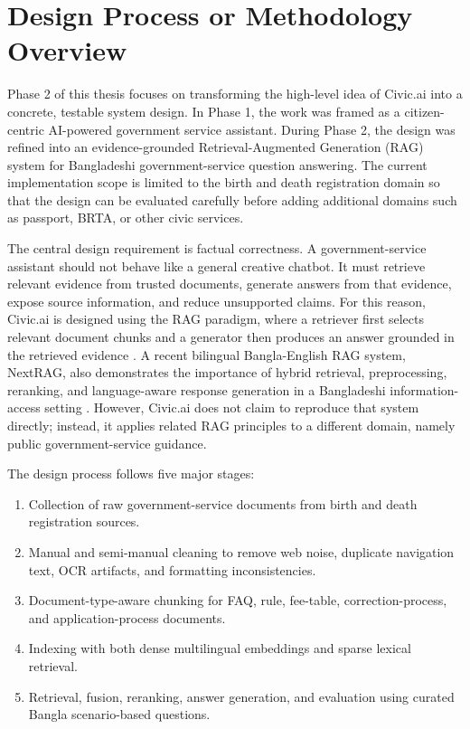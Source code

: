 \section{Design Process or Methodology Overview}

Phase 2 of this thesis focuses on transforming the high-level idea of Civic.ai into a concrete, testable system design. In Phase 1, the work was framed as a citizen-centric AI-powered government service assistant. During Phase 2, the design was refined into an evidence-grounded Retrieval-Augmented Generation (RAG) system for Bangladeshi government-service question answering. The current implementation scope is limited to the birth and death registration domain so that the design can be evaluated carefully before adding additional domains such as passport, BRTA, or other civic services.

The central design requirement is factual correctness. A government-service assistant should not behave like a general creative chatbot. It must retrieve relevant evidence from trusted documents, generate answers from that evidence, expose source information, and reduce unsupported claims. For this reason, Civic.ai is designed using the RAG paradigm, where a retriever first selects relevant document chunks and a generator then produces an answer grounded in the retrieved evidence \cite{lewis2020rag}. A recent bilingual Bangla-English RAG system, NextRAG, also demonstrates the importance of hybrid retrieval, preprocessing, reranking, and language-aware response generation in a Bangladeshi information-access setting \cite{nextrag2025}. However, Civic.ai does not claim to reproduce that system directly; instead, it applies related RAG principles to a different domain, namely public government-service guidance.

The design process follows five major stages:

\begin{enumerate}
    \item Collection of raw government-service documents from birth and death registration sources.
    \item Manual and semi-manual cleaning to remove web noise, duplicate navigation text, OCR artifacts, and formatting inconsistencies.
    \item Document-type-aware chunking for FAQ, rule, fee-table, correction-process, and application-process documents.
    \item Indexing with both dense multilingual embeddings and sparse lexical retrieval.
    \item Retrieval, fusion, reranking, answer generation, and evaluation using curated Bangla scenario-based questions.
\end{enumerate}

